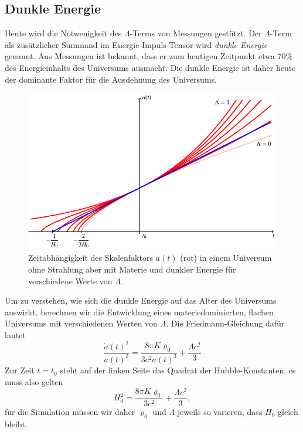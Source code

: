 \subsection{Dunkle Energie}
Heute wird die Notwenigkeit des $\Lambda$-Terms von Messungen
gestützt.
Der $\Lambda$-Term als zusätzlicher Summand im Energie-Impuls-Tensor
wird {\em dunkle Energie} genannt.
Aus Messungen ist bekannt, dass er zum heutigen Zeitpunkt etwa 70\%
des Energieinhalts des Universums ausmacht.
Die dunkle Energie ist daher heute der dominante Faktor für die
Ausdehnung des Universums.
\begin{figure}
\centering
\includegraphics{chapters/tikz/darkenergy.pdf}
\caption{Zeitabhängigkeit des Skalenfaktors $a(t)$ ({\color{red}rot})
in einem Universum ohne Strahlung aber mit Materie und dunkler Energie
für verschiedene Werte von $\Lambda$.
\label{skript:friedman:graph:darkenergy}}
\end{figure}

Um zu verstehen, wie sich die dunkle Energie auf das Alter des Universums
auswirkt, berechnen wir die Entwicklung eines materiedominierten, flachen 
Universums mit verschiedenen Werten von $\Lambda$.
Die Friedmann-Gleichung dafür lautet
\[
\frac{\dot a(t)^2}{a(t)^2}
=
\frac{8\pi K \varrho_0}{3c^2a(t)^3} + \frac{\Lambda c^2}{3}
\]
Zur Zeit $t=t_0$ steht auf der linken Seite das Quadrat der Hubble-Konstanten,
es muss also gelten
\[
H_0^2
=
\frac{8\pi K \varrho_0}{3c^2} + \frac{\Lambda c^2}{3},
\]
für die Simulation müssen wir daher $\varrho_0$ und $\Lambda$ jeweils
so varieren, dass $H_0$ gleich bleibt.

